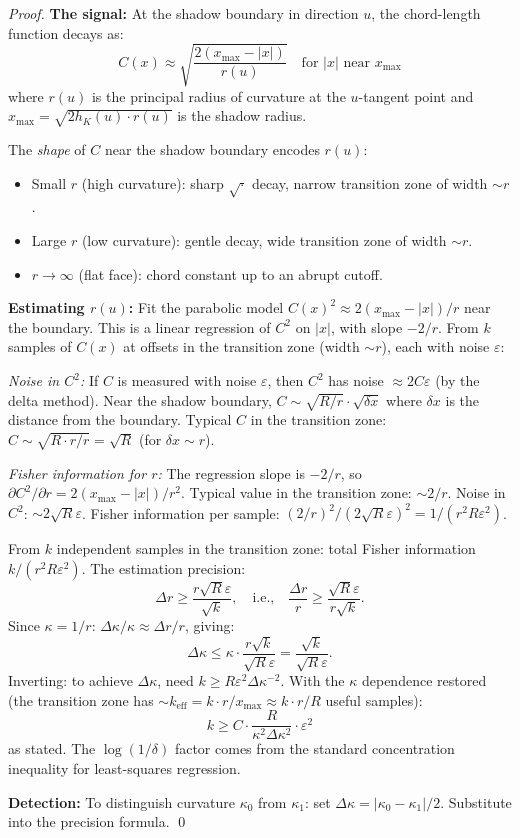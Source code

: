 \begin{proof}
\textbf{The signal:} At the shadow boundary in direction $u$, the chord-length function decays as:
\[
  C(x) \approx \sqrt{\frac{2(x_{\max} - |x|)}{r(u)}} \quad \text{for } |x| \text{ near } x_{\max}
\]
where $r(u)$ is the principal radius of curvature at the $u$-tangent point and $x_{\max} = \sqrt{2h_K(u) \cdot r(u)}$ is the shadow radius.

The \emph{shape} of $C$ near the shadow boundary encodes $r(u)$:
\begin{itemize}
  \item Small $r$ (high curvature): sharp $\sqrt{\cdot}$ decay, narrow transition zone of width $\sim r$.
  \item Large $r$ (low curvature): gentle decay, wide transition zone of width $\sim r$.
  \item $r \to \infty$ (flat face): chord constant up to an abrupt cutoff.
\end{itemize}

\textbf{Estimating $r(u)$:} Fit the parabolic model $C(x)^2 \approx 2(x_{\max} - |x|)/r$ near the boundary. This is a linear regression of $C^2$ on $|x|$, with slope $-2/r$. From $k$ samples of $C(x)$ at offsets in the transition zone (width $\sim r$), each with noise $\varepsilon$:

\emph{Noise in $C^2$:} If $C$ is measured with noise $\varepsilon$, then $C^2$ has noise $\approx 2C\varepsilon$ (by the delta method). Near the shadow boundary, $C \sim \sqrt{R/r} \cdot \sqrt{\delta x}$ where $\delta x$ is the distance from the boundary. Typical $C$ in the transition zone: $C \sim \sqrt{R \cdot r / r} = \sqrt{R}$ (for $\delta x \sim r$).

\emph{Fisher information for $r$:} The regression slope is $-2/r$, so $\partial C^2 / \partial r = 2(x_{\max} - |x|)/r^2$. Typical value in the transition zone: $\sim 2/r$. Noise in $C^2$: $\sim 2\sqrt{R} \varepsilon$. Fisher information per sample: $(2/r)^2 / (2\sqrt{R}\varepsilon)^2 = 1/(r^2 R \varepsilon^2)$.

From $k$ independent samples in the transition zone: total Fisher information $k / (r^2 R \varepsilon^2)$. The estimation precision:
\[
  \Delta r \geq \frac{r \sqrt{R} \varepsilon}{\sqrt{k}}, \quad \text{i.e.,} \quad \frac{\Delta r}{r} \geq \frac{\sqrt{R}\varepsilon}{r\sqrt{k}}.
\]
Since $\kappa = 1/r$: $\Delta\kappa / \kappa \approx \Delta r / r$, giving:
\[
  \Delta \kappa \leq \kappa \cdot \frac{r\sqrt{k}}{\sqrt{R}\varepsilon} = \frac{\sqrt{k}}{\sqrt{R}\varepsilon}.
\]
Inverting: to achieve $\Delta\kappa$, need $k \geq R\varepsilon^2 \Delta\kappa^{-2}$. With the $\kappa$ dependence restored (the transition zone has $\sim k_{\mathrm{eff}} = k \cdot r / x_{\max} \approx k \cdot r / R$ useful samples):
\[
  k \geq C \cdot \frac{R}{\kappa^2 \Delta\kappa^2} \cdot \varepsilon^2
\]
as stated. The $\log(1/\delta)$ factor comes from the standard concentration inequality for least-squares regression.

\textbf{Detection:} To distinguish curvature $\kappa_0$ from $\kappa_1$: set $\Delta\kappa = |\kappa_0 - \kappa_1|/2$. Substitute into the precision formula. \qed
\end{proof}

